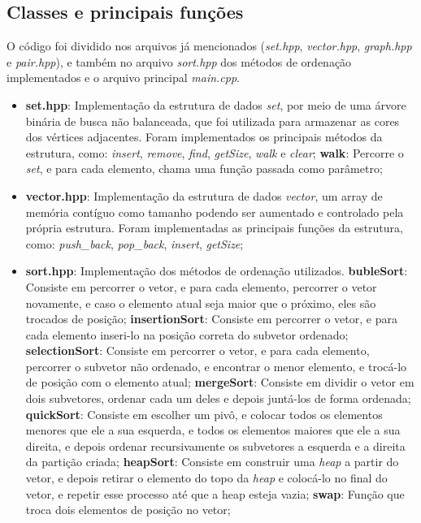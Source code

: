 \documentclass{article}
\begin{document}
\subsection{Classes e principais funções}
O código foi dividido nos arquivos já mencionados (\emph{set.hpp}, \emph{vector.hpp}, \emph{graph.hpp} e \emph{pair.hpp}), e também no arquivo \emph{sort.hpp} dos métodos de ordenação implementados e o arquivo principal \emph{main.cpp}.
\begin{itemize}
    \item \textbf{set.hpp}: Implementação da estrutura de dados \emph{set}, por meio de uma árvore binária de busca não balanceada, que foi utilizada para armazenar as cores dos vértices adjacentes. Foram implementados os principais métodos da estrutura, como: \emph{insert}, \emph{remove}, \emph{find}, \emph{getSize}, \emph{walk} e \emph{clear};
        \subitem \textbf{walk}: Percorre o \emph{set}, e para cada elemento, chama uma função passada como parâmetro;

    \item \textbf{vector.hpp}: Implementação da estrutura de dados \emph{vector}, um array de memória contíguo como tamanho podendo ser aumentado e controlado pela própria estrutura. Foram implementadas as principais funções da estrutura, como: \emph{push\_back}, \emph{pop\_back}, \emph{insert},  \emph{getSize};

    \item \textbf{sort.hpp}: Implementação dos métodos de ordenação utilizados.
        \subitem \textbf{bubleSort}: Consiste em percorrer o vetor, e para cada elemento, percorrer o vetor novamente, e caso o elemento atual seja maior que o próximo, eles são trocados de posição;
        \subitem \textbf{insertionSort}: Consiste em percorrer o vetor, e para cada elemento inseri-lo na posição correta do subvetor ordenado;
        \subitem \textbf{selectionSort}: Consiste em percorrer o vetor, e para cada elemento, percorrer o subvetor não ordenado, e encontrar o menor elemento, e trocá-lo de posição com o elemento atual;
        \subitem \textbf{mergeSort}: Consiste em dividir o vetor em dois subvetores, ordenar cada um deles e depois juntá-los de forma ordenada;
        \subitem \textbf{quickSort}: Consiste em escolher um pivô, e colocar todos os elementos menores que ele a sua esquerda, e todos os elementos maiores que ele a sua direita, e depois ordenar recursivamente os subvetores a esquerda e a direita da partição criada;
        \subitem \textbf{heapSort}: Consiste em construir uma \emph{heap} a partir do vetor, e depois retirar o elemento do topo da \emph{heap} e colocá-lo no final do vetor, e repetir esse processo até que a heap esteja vazia;
        \subitem \textbf{swap}: Função que troca dois elementos de posição no vetor;
    

\end{itemize}
\end{document}

